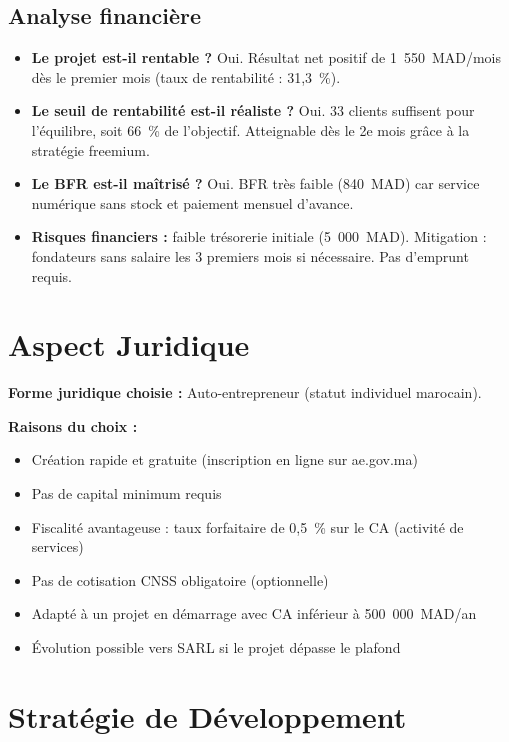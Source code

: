 \documentclass[12pt,a4paper]{report}
\begin{document}
\subsection{Analyse financière}

\begin{itemize}
  \item \textbf{Le projet est-il rentable ?} Oui. Résultat net positif de 1~550~MAD/mois dès le premier mois (taux de rentabilité : 31,3~\%).
  \item \textbf{Le seuil de rentabilité est-il réaliste ?} Oui. 33 clients suffisent pour l'équilibre, soit 66~\% de l'objectif. Atteignable dès le 2e mois grâce à la stratégie freemium.
  \item \textbf{Le BFR est-il maîtrisé ?} Oui. BFR très faible (840~MAD) car service numérique sans stock et paiement mensuel d'avance.
  \item \textbf{Risques financiers :} faible trésorerie initiale (5~000~MAD). Mitigation : fondateurs sans salaire les 3 premiers mois si nécessaire. Pas d'emprunt requis.
\end{itemize}

\section{Aspect Juridique}

\textbf{Forme juridique choisie :} Auto-entrepreneur (statut individuel marocain).

\textbf{Raisons du choix :}
\begin{itemize}
  \item Création rapide et gratuite (inscription en ligne sur ae.gov.ma)
  \item Pas de capital minimum requis
  \item Fiscalité avantageuse : taux forfaitaire de 0,5~\% sur le CA (activité de services)
  \item Pas de cotisation CNSS obligatoire (optionnelle)
  \item Adapté à un projet en démarrage avec CA inférieur à 500~000~MAD/an
  \item Évolution possible vers SARL si le projet dépasse le plafond
\end{itemize}

\section{Stratégie de Développement}
\end{document}
